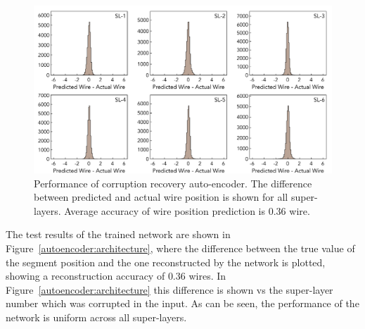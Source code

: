  \begin{figure}[!ht]
\begin{center}
\includegraphics[width=6.0in]{images/encoder_performance.pdf}
\caption {Performance of corruption recovery auto-encoder. The difference between predicted and actual 
wire position is shown for all super-layers. Average accuracy of wire position prediction is  $0.36$ wire.}
 \label{autoencoder:performance}
 \end{center}
\end{figure}

The test results of the trained network are shown in Figure~\ref{autoencoder:architecture}, where the 
difference between the true value of the segment position and the one reconstructed by the network is 
plotted, showing a reconstruction accuracy of $0.36$ wires. In Figure~\ref{autoencoder:architecture} 
this difference is shown vs the super-layer number which was corrupted in the input. As can be seen, 
the performance of the network is uniform across all super-layers.
